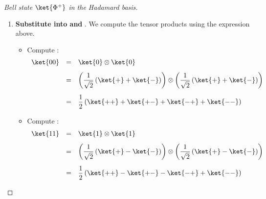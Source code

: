 \begin{examplebox}
\begin{proof}[Bell state $\ket{\Phi^{+}}$ in the Hadamard basis]
\begin{enumerate}
            \item \textbf{Substitute into  and }. We compute the tensor products using the expression above.
            \begin{itemize}
                \item Compute :
                \begin{equation*}
                    \begin{array}{rcl}
                        \ket{00} &=& \ket{0} \otimes \ket{0} \\ [.8em]
                        &=& \left( \dfrac{1}{\sqrt{2}} \left(\ket{+} + \ket{-}\right) \right)
                            \otimes
                            \left( \dfrac{1}{\sqrt{2}} \left(\ket{+} + \ket{-}\right) \right) \\ [1.5em]
                        &=& \dfrac{1}{2} \left(\ket{++} + \ket{+-} + \ket{-+} + \ket{--}\right)
                    \end{array}
                \end{equation*}
                \item Compute :
                \begin{equation*}
                    \begin{array}{rcl}
                        \ket{11} &=& \ket{1} \otimes \ket{1} \\ [.8em]
                        &=& \left( \dfrac{1}{\sqrt{2}} \left(\ket{+} - \ket{-}\right) \right)
                            \otimes
                            \left( \dfrac{1}{\sqrt{2}} \left(\ket{+} - \ket{-}\right) \right) \\ [1.5em]
                        &=& \dfrac{1}{2} \left(\ket{++} - \ket{+-} - \ket{-+} + \ket{--}\right)
                    \end{array}
                \end{equation*}
            \end{itemize}


\end{enumerate}
\end{proof}
\end{examplebox}
